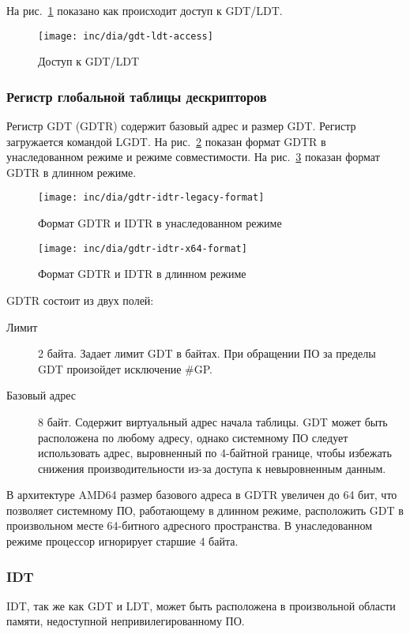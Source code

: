 На рис.~\ref{fig:gdt-ldt-access} показано как происходит доступ к GDT/LDT.

\begin{figure}[ht!]
  \centering
  \texttt{[image: inc/dia/gdt-ldt-access]}
  \caption{Доступ к GDT/LDT}
  \label{fig:gdt-ldt-access}
\end{figure}

\subsubsection*{Регистр глобальной таблицы дескрипторов}
Регистр GDT (GDTR) содержит базовый адрес и размер GDT. Регистр загружается командой LGDT.
На рис.~\ref{fig:gdtr-idtr-legacy-format} показан формат GDTR в унаследованном режиме и
режиме совместимости. На рис.~\ref{fig:gdtr-idtr-x64-format} показан формат GDTR в длинном режиме.

\begin{figure}[ht!]
  \centering
  \texttt{[image: inc/dia/gdtr-idtr-legacy-format]}
  \caption{Формат GDTR и IDTR в унаследованном режиме}
  \label{fig:gdtr-idtr-legacy-format}
\end{figure}

\begin{figure}[ht!]
  \centering
  \texttt{[image: inc/dia/gdtr-idtr-x64-format]}
  \caption{Формат GDTR и IDTR в длинном режиме}
  \label{fig:gdtr-idtr-x64-format}
\end{figure}

GDTR состоит из двух полей:
\begin{description}
\item[Лимит] 2 байта. Задает лимит GDT в байтах. При обращении ПО за пределы GDT произойдет
	исключение \#GP.
\item[Базовый адрес] 8 байт. Содержит виртуальный адрес начала таблицы. GDT может быть расположена
	по любому адресу, однако системному ПО следует использовать адрес, выровненный по 4-байтной границе,
	чтобы избежать снижения производительности из-за доступа к невыровненным данным.
\end{description}

В архитектуре AMD64 размер базового адреса в GDTR увеличен до 64 бит, что позволяет системному ПО,
работающему в длинном режиме, расположить GDT в произвольном месте 64-битного адресного пространства.
В унаследованном режиме процессор игнорирует старшие 4 байта.


\subsubsection*{IDT}
IDT, так же как GDT и LDT, может быть расположена в произвольной области памяти, недоступной непривилегированному ПО.

